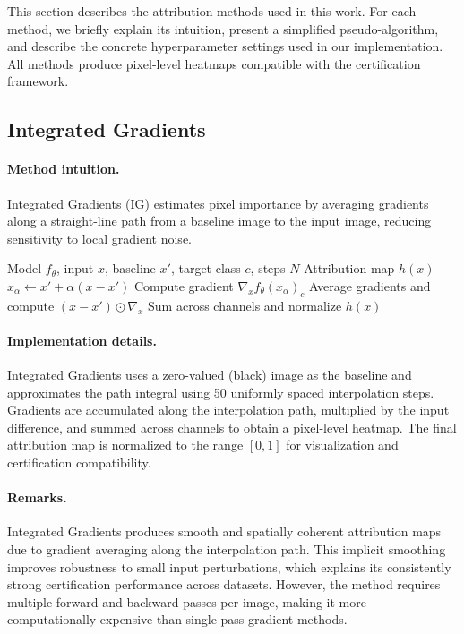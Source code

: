 \documentclass[11pt]{article}
\begin{document}
This section describes the attribution methods used in this work. For each method, we briefly explain its intuition, present a simplified pseudo-algorithm, and describe the concrete hyperparameter settings used in our implementation. All methods produce pixel-level heatmaps compatible with the certification framework.

\subsection{Integrated Gradients}

\paragraph{Method intuition.}
Integrated Gradients (IG) estimates pixel importance by averaging gradients along a straight-line path from a baseline image to the input image, reducing sensitivity to local gradient noise.

\begin{algorithm}[H]
\caption{Integrated Gradients (IG)}
\label{alg:ig}
\begin{algorithmic}[1]
\REQUIRE Model $f_\theta$, input $x$, baseline $x'$, target class $c$, steps $N$
\ENSURE Attribution map $h(x)$
    \STATE $x_\alpha \leftarrow x' + \alpha (x - x')$
    \STATE Compute gradient $\nabla_x f_\theta(x_\alpha)_c$
\ENDFOR
\STATE Average gradients and compute $(x - x') \odot \nabla_x$
\STATE Sum across channels and normalize
\RETURN $h(x)$
\end{algorithmic}
\end{algorithm}

\paragraph{Implementation details.}
Integrated Gradients uses a zero-valued (black) image as the baseline and approximates the path integral using 50 uniformly spaced interpolation steps. Gradients are accumulated along the interpolation path, multiplied by the input difference, and summed across channels to obtain a pixel-level heatmap. The final attribution map is normalized to the range $[0,1]$ for visualization and certification compatibility.

\paragraph{Remarks.}
Integrated Gradients produces smooth and spatially coherent attribution maps due to gradient averaging along the interpolation path. This implicit smoothing improves robustness to small input perturbations, which explains its consistently strong certification performance across datasets. However, the method requires multiple forward and backward passes per image, making it more computationally expensive than single-pass gradient methods.
\end{document}
